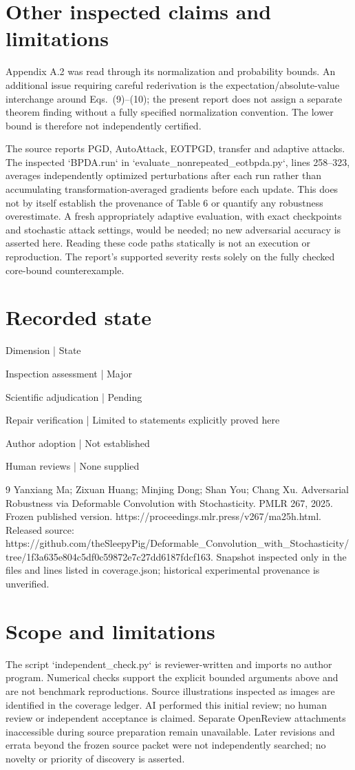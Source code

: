 \documentclass[10pt]{article}
\begin{document}
\section*{Other inspected claims and limitations}
Appendix A.2 was read through its normalization and probability bounds. An additional issue requiring careful rederivation is the expectation/absolute-value interchange around Eqs. (9)–(10); the present report does not assign a separate theorem finding without a fully specified normalization convention. The lower bound is therefore not independently certified.\par
The source reports PGD, AutoAttack, EOTPGD, transfer and adaptive attacks. The inspected `BPDA.run` in `evaluate\_nonrepeated\_eotbpda.py`, lines 258–323, averages independently optimized perturbations after each run rather than accumulating transformation-averaged gradients before each update. This does not by itself establish the provenance of Table 6 or quantify any robustness overestimate. A fresh appropriately adaptive evaluation, with exact checkpoints and stochastic attack settings, would be needed; no new adversarial accuracy is asserted here. Reading these code paths statically is not an execution or reproduction. The report’s supported severity rests solely on the fully checked core-bound counterexample.\par
\section*{Recorded state}
Dimension | State\par
Inspection assessment | Major\par
Scientific adjudication | Pending\par
Repair verification | Limited to statements explicitly proved here\par
Author adoption | Not established\par
Human reviews | None supplied\par
9 Yanxiang Ma; Zixuan Huang; Minjing Dong; Shan You; Chang Xu. Adversarial Robustness via Deformable Convolution with Stochasticity. PMLR 267, 2025. Frozen published version. https://proceedings.mlr.press/v267/ma25h.html. Released source: https://github.com/theSleepyPig/Deformable\_Convolution\_with\_Stochasticity/tree/1f3a635e804c5df0c59872e7c27dd6187fdcf163. Snapshot inspected only in the files and lines listed in coverage.json; historical experimental provenance is unverified.\par
\section*{Scope and limitations}
The script `independent\_check.py` is reviewer-written and imports no author program. Numerical checks support the explicit bounded arguments above and are not benchmark reproductions. Source illustrations inspected as images are identified in the coverage ledger. AI performed this initial review; no human review or independent acceptance is claimed. Separate OpenReview attachments inaccessible during source preparation remain unavailable. Later revisions and errata beyond the frozen source packet were not independently searched; no novelty or priority of discovery is asserted.\par
\end{document}
